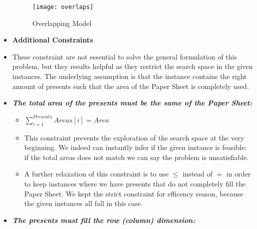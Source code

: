 \begin{itemize}
        \begin{figure}
            \centering
            \texttt{[image: overlaps]}
            \caption{Overlapping Model}
            \label{fig:overlaps}
        \end{figure}

    \item[] \textbf{Additional Constraints}
    \item[] These constraint are not essential to solve the general formulation of this problem,
        but they results helpful as they restrict the search space in the given instances.
        The underlying assumption is that the instance contains the right amount of presents such
        that the area of the Paper Sheet is completely used.
    \item \textbf{\textit{The total area of the presents must be the same of the Paper Sheet:}}
        \begin{itemize}
            \item[] $\sum_{i = 1}^{Presents}{Areas[i]} = Area$
            \item[] This constraint prevents the exploration of the search space
                at the very beginning. We indeed can instantly infer if the given instance is
                feasible: if the total areas does not match we can say the problem is unsatisfiable.
            \item[] A further relaxation of this constraint is to use $\leq$ instead of $=$ in order 
                to keep instances where we have presents that do not completely fill the Paper Sheet. 
                We kept the strict constraint for efficency reason, because the given instances all fall
                in this case.
        \end{itemize}
    \item \textbf{\textit{The presents must fill the row (column) dimension:}}
\end{itemize}
